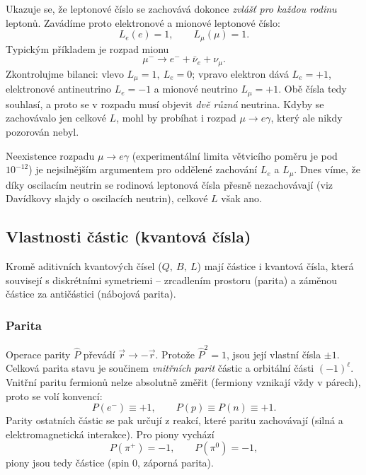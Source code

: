 Ukazuje se, že leptonové číslo se zachovává dokonce \emph{zvlášť pro každou
rodinu} leptonů. Zavádíme proto elektronové a mionové leptonové číslo:
\[
  L_e(e)=1,\qquad L_\mu(\mu)=1 .
\]
Typickým příkladem je rozpad mionu
\[
  \mu^- \to e^- + \bar\nu_e + \nu_\mu .
\]
Zkontrolujme bilanci: vlevo \(L_\mu=1,\ L_e=0\); vpravo elektron dává
\(L_e=+1\), elektronové antineutrino \(L_e=-1\) a mionové neutrino
\(L_\mu=+1\). Obě čísla tedy souhlasí, a proto se v rozpadu musí objevit
\emph{dvě různá} neutrina. Kdyby se zachovávalo jen celkové \(L\), mohl by
probíhat i rozpad \(\mu\to e\gamma\), který ale nikdy pozorován nebyl.

\begin{vysvetleni}
Neexistence rozpadu \(\mu\to e\gamma\) (experimentální limita větvicího
poměru je pod \(10^{-12}\)) je nejsilnějším argumentem pro oddělené
zachování \(L_e\) a \(L_\mu\). Dnes víme, že díky oscilacím neutrin se
rodinová leptonová čísla přesně nezachovávají (viz Davídkovy slajdy o
oscilacích neutrin), celkové \(L\) však ano.
\end{vysvetleni}

\subsection{Vlastnosti částic (kvantová čísla)}

Kromě aditivních kvantových čísel (\(Q,\ B,\ L\)) mají částice i
 kvantová čísla, která souvisejí s diskrétními
symetriemi -- zrcadlením prostoru (parita) a záměnou částice za antičástici
(nábojová parita).

\subsubsection*{Parita}
Operace parity \(\hat P\) převádí \(\vec r\to-\vec r\). Protože
\(\hat P^2=1\), jsou její vlastní čísla \(\pm1\). Celková parita stavu je
součinem \emph{vnitřních parit} částic a orbitální části \((-1)^{\ell}\).
Vnitřní paritu fermionů nelze absolutně změřit (fermiony vznikají vždy
v párech), proto se volí konvencí:
\[
  P(e^-)\equiv+1,\qquad P(p)\equiv P(n)\equiv+1 .
\]
Parity ostatních částic se pak určují z reakcí, které paritu zachovávají
(silná a elektromagnetická interakce). Pro piony vychází
\[
  P(\pi^+)=-1,\qquad P(\pi^0)=-1 ,
\]
piony jsou tedy  částice (spin 0, záporná parita).


